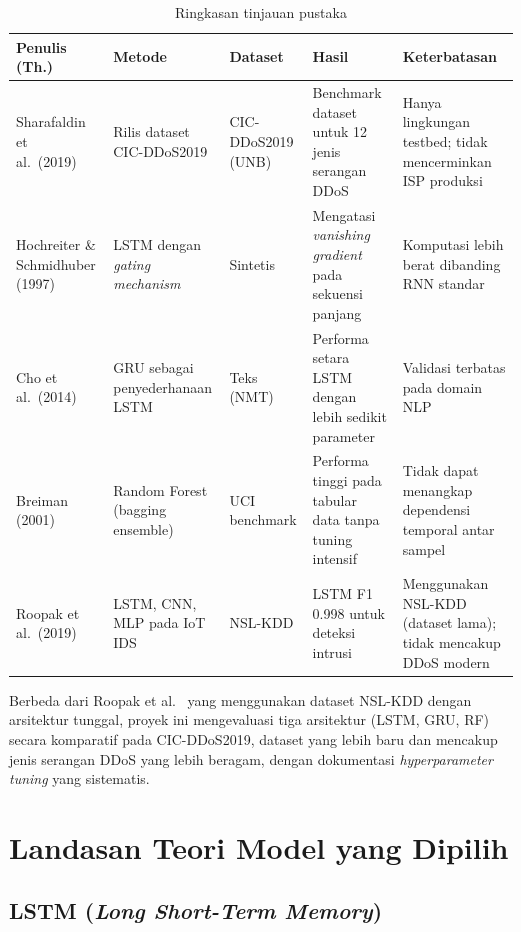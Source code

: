 \documentclass[11pt,a4paper,oneside]{report}
\begin{document}
\begin{table}[h!]
\centering
\caption{Ringkasan tinjauan pustaka}
\label{tab:related-work}
\begin{tabularx}{\textwidth}{p{3.2cm}p{2.8cm}p{2.2cm}p{2.5cm}p{2.5cm}}
\toprule
\textbf{Penulis (Th.)} & \textbf{Metode} & \textbf{Dataset} & \textbf{Hasil} & \textbf{Keterbatasan} \\
\midrule
Sharafaldin et al.\ (2019)~\cite{sharafaldin2019} & Rilis dataset CIC-DDoS2019 & CIC-DDoS2019 (UNB) & Benchmark dataset untuk 12 jenis serangan DDoS & Hanya lingkungan testbed; tidak mencerminkan ISP produksi \\
\addlinespace
Hochreiter \& Schmidhuber (1997)~\cite{hochreiter1997} & LSTM dengan \textit{gating mechanism} & Sintetis & Mengatasi \textit{vanishing gradient} pada sekuensi panjang & Komputasi lebih berat dibanding RNN standar \\
\addlinespace
Cho et al.\ (2014)~\cite{cho2014} & GRU sebagai penyederhanaan LSTM & Teks (NMT) & Performa setara LSTM dengan lebih sedikit parameter & Validasi terbatas pada domain NLP \\
\addlinespace
Breiman (2001)~\cite{breiman2001} & Random Forest (bagging ensemble) & UCI benchmark & Performa tinggi pada tabular data tanpa tuning intensif & Tidak dapat menangkap dependensi temporal antar sampel \\
\addlinespace
Roopak et al.\ (2019)~\cite{roopak2019} & LSTM, CNN, MLP pada IoT IDS & NSL-KDD & LSTM F1 0.998 untuk deteksi intrusi & Menggunakan NSL-KDD (dataset lama); tidak mencakup DDoS modern \\
\bottomrule
\end{tabularx}
\end{table}

Berbeda dari Roopak et al.~\cite{roopak2019} yang menggunakan dataset NSL-KDD dengan arsitektur tunggal, proyek ini mengevaluasi tiga arsitektur (LSTM, GRU, RF) secara komparatif pada CIC-DDoS2019, dataset yang lebih baru dan mencakup jenis serangan DDoS yang lebih beragam, dengan dokumentasi \textit{hyperparameter tuning} yang sistematis.

\section{Landasan Teori Model yang Dipilih}

\subsection*{LSTM (\textit{Long Short-Term Memory})}
\end{document}
